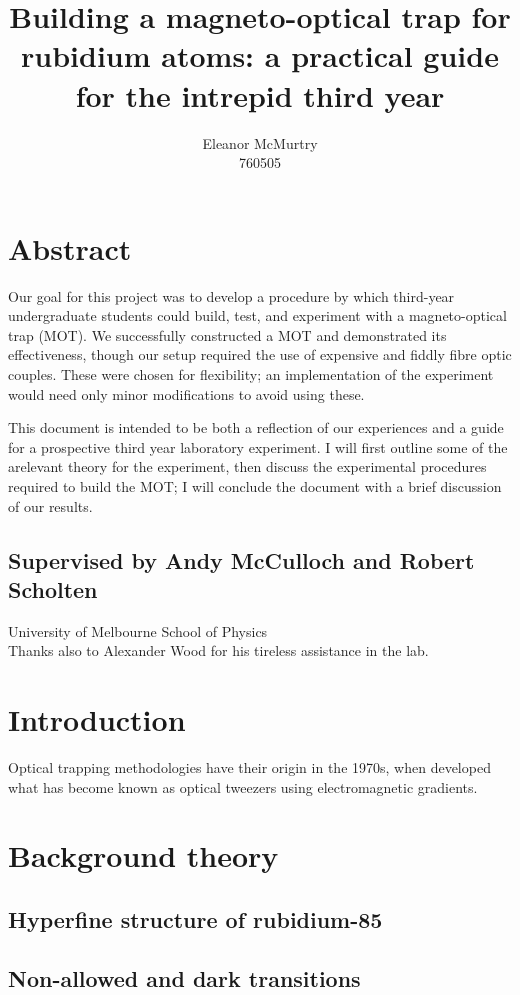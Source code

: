 \documentclass[11pt,twoside,a4paper]{article}
\author{Eleanor McMurtry\\760505}
\title{Building a magneto-optical trap for rubidium atoms: a practical guide for the intrepid third year}
\begin{document}
\maketitle
\section*{Abstract}
Our goal for this project was to develop a procedure by which third-year undergraduate students could
build, test, and experiment with a magneto-optical trap (MOT). We successfully constructed a MOT and
demonstrated its effectiveness, though our setup required the use of expensive and fiddly fibre optic couples.
These were chosen for flexibility; an implementation of the experiment would need only minor modifications
to avoid using these.

This document is intended to be both a reflection of our experiences and a guide for a prospective
third year laboratory experiment. I will first outline some of the arelevant theory for the experiment,
then discuss the experimental procedures required to build the MOT; I will conclude the document with a brief
discussion of our results.

\begin{center}    
\subsection*{Supervised by Andy McCulloch and Robert Scholten}
University of Melbourne School of Physics\\
Thanks also to Alexander Wood for his tireless assistance in the lab.
\end{center}
\pagebreak
\tableofcontents
\vfill
\pagebreak
\section{Introduction}
Optical trapping methodologies have their origin in the 1970s, when \cite{ashkin} developed what has become known
as optical tweezers using electromagnetic gradients.
\section{Background theory}
\subsection{Hyperfine structure of rubidium-85}
\subsection{Non-allowed and dark transitions}
\end{document}
